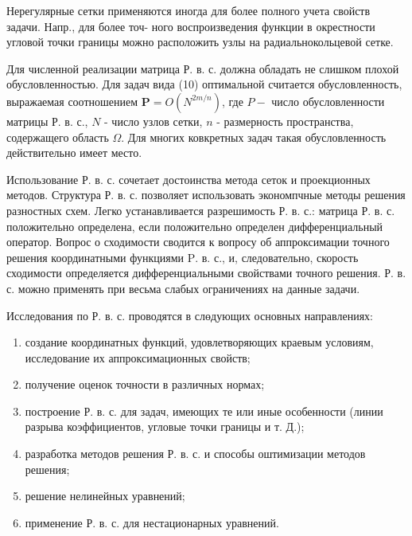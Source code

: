 \documentclass[10pt]{article}
\begin{document}
Нерегулярные сетки применяются иногда для более полного учета свойств задачи. Напр., для более точ- ного воспроизведения функции в окрестности угловой точки границы можно расположить узлы на радиальнокольцевой сетке.



Для численной реализации матрица Р. в. с. должна обладать не слишком плохой обусловленностью. Для задач вида (10) оптимальной считается обусловленность, выражаемая соотношением $\boldsymbol{P}=O\left(N^{2 m / n}\right)$, где $P-$ число обусловленности матрицы Р. в. с., $N$ - число узлов сетки, $n$ - размерность пространства, содержащего область $\Omega$. Для многих ковкретных задач такая обусловленность действительно имеет место.



Использование Р. в. с. сочетает достоинства метода сеток и проекционных методов. Структура Р. в. с. позволяет использовать экономпчные методы решения разностных схем. Легко устанавливается разрешимость Р. в. с.: матрица Р. в. с. положительно определена, если положительно определен дифференциальный оператор. Вопрос о сходимости сводится к вопросу об аппроксимации точного решения координатными функциями $\mathrm{P}$. в. с., и, следовательно, скорость сходимости определяется дифференциальными свойствами точного решения. Р. в. с. можно применять при весьма слабых ограничениях на данные задачи.



Исследования по Р. в. с. проводятся в слөдующих основных направлениях:



\begin{enumerate}

  \item создание координатных функций, удовлетворяющих краевым условиям, исследование их аппроксимационных свойств;



  \item получение оценок точности в различных нормах;



  \item построение Р. в. с. для задач, имеющих те или иные особенности (линии разрыва коэффициентов, угловые точки границы и т. Д.);



  \item разработка методов решения Р. в. с. и способы оштимизации методов решения;



  \item решение нелинейных уравнений;



  \item применение Р. в. с. для нестационарных уравнений.



\end{enumerate}
\end{document}
